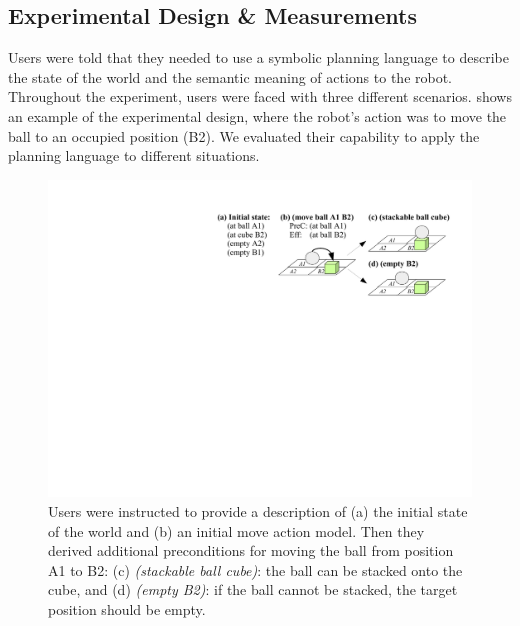  

\subsection{Experimental Design \& Measurements}
Users were told that they needed to use a symbolic planning language to describe the state of the world and the semantic meaning of actions to the robot. 
Throughout the experiment, users were faced with three different scenarios. 
 shows an example of the experimental design, where the robot's action was to move the ball to an occupied position (B2). 
We evaluated their capability to apply the planning language to different situations.

\begin{figure}[h]
	\centering
	\includegraphics[width=0.75\linewidth]{figures/scenarios-exp1}
	\caption{Users were instructed to provide a description of (a) the initial state of the world and (b) an initial move action model.
		Then they derived additional preconditions for moving the ball from position A1 to B2: (c) \textit{(stackable ball cube)}: the ball can be stacked onto the cube, and (d) \textit{(empty B2)}: if the ball cannot be stacked, the target position should be empty.}
	\label{fig:scenarios-exp1}
\end{figure}


